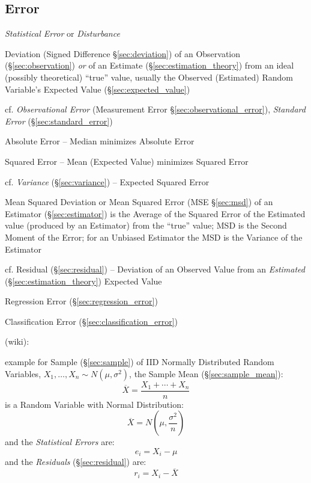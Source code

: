 \subsection{Error}\label{sec:error}

\emph{Statistical Error} or \emph{Disturbance}

Deviation (Signed Difference \S\ref{sec:deviation}) of an Observation
(\S\ref{sec:observation}) \emph{or} of an Estimate
(\S\ref{sec:estimation_theory}) from an ideal (possibly theoretical) ``true''
value, usually the Observed (Estimated) Random Variable's Expected Value
(\S\ref{sec:expected_value})

\fist cf. \emph{Observational Error} (Measurement Error
\S\ref{sec:observational_error}), \emph{Standard Error}
  (\S\ref{sec:standard_error})

Absolute Error -- Median minimizes Absolute Error

Squared Error -- Mean (Expected Value) minimizes Squared Error

cf. \emph{Variance} (\S\ref{sec:variance}) -- Expected Squared Error

\fist Mean Squared Deviation or Mean Squared Error (MSE \S\ref{sec:msd}) of an
Estimator (\S\ref{sec:estimator}) is the Average of the Squared Error of the
Estimated value (produced by an Estimator) from the ``true'' value; MSD is
the Second Moment of the Error; for an Unbiased Estimator the MSD is the
Variance of the Estimator

cf. Residual (\S\ref{sec:residual}) -- Deviation of an Observed Value from an
\emph{Estimated} (\S\ref{sec:estimation_theory}) Expected Value

\fist Regression Error (\S\ref{sec:regression_error})

\fist Classification Error (\S\ref{sec:classification_error})

(wiki):

example for Sample (\S\ref{sec:sample}) of IID Normally Distributed Random
Variables, $X_1, \ldots, X_n \sim N(\mu, \sigma^2)$, the Sample Mean
(\S\ref{sec:sample_mean}):
\[
  \overline{X} = \frac{X_1 + \cdots + X_n}{n}
\]
is a Random Variable with Normal Distribution:
\[
  \overline{X} = N(\mu, \frac{\sigma^2}{n})
\]
and the \emph{Statistical Errors} are:
\[
  e_i = X_i - \mu
\]
and the \emph{Residuals} (\S\ref{sec:residual}) are:
\[
  r_i = X_i - \overline{X}
\]



